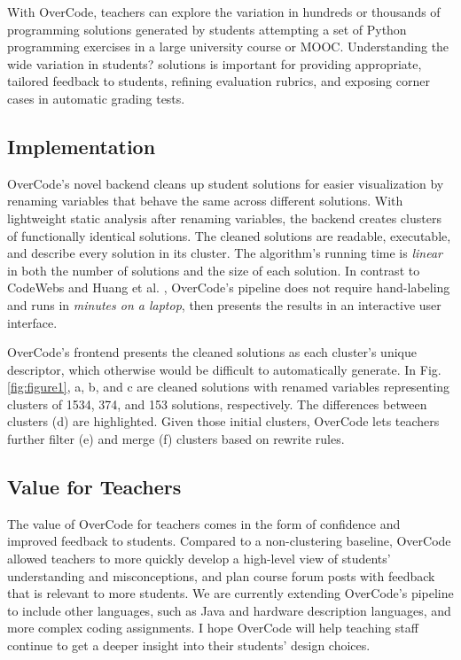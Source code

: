 \documentclass{sigchi}
\begin{document}
With OverCode, teachers can explore the variation in hundreds or thousands of programming solutions generated by students attempting a set of Python programming exercises in a large university course or MOOC. Understanding the wide variation in students? solutions is important for providing appropriate, tailored feedback to students, refining evaluation rubrics, and exposing corner cases in automatic grading tests.

\subsection{Implementation}
OverCode's novel backend cleans up student solutions for easier visualization by renaming variables that behave the same across different solutions. With lightweight static analysis after renaming variables, the backend creates clusters of functionally identical solutions. The cleaned solutions are readable, executable, and describe every solution in its cluster. The algorithm's running time is \emph{linear} in both the number of solutions and the size of each solution. In contrast to CodeWebs \cite{codewebs} and Huang et al. \citeyear{MOOCshop}, OverCode's pipeline does not require hand-labeling and runs in \emph{minutes on a laptop}, then presents the results in an interactive user interface.

OverCode's frontend presents the cleaned solutions as each cluster's unique descriptor, which otherwise would be difficult to automatically generate. In Fig. \ref{fig:figure1}, a, b, and c are cleaned solutions with renamed variables representing clusters of 1534, 374, and 153 solutions, respectively. The differences between clusters (d) are highlighted. Given those initial clusters, OverCode lets teachers further filter (e) and merge (f) clusters based on rewrite rules.

\subsection{Value for Teachers}
The value of OverCode for teachers comes in the form of confidence and improved feedback to students. Compared to a non-clustering baseline, OverCode allowed teachers to more quickly develop a high-level view of students' understanding and misconceptions, and plan course forum posts with feedback that is relevant to more students. We are currently extending OverCode's pipeline to include other languages, such as Java and hardware description languages, and more complex coding assignments. I hope OverCode will help teaching staff continue to get a deeper insight into their students' design choices.
\end{document}
